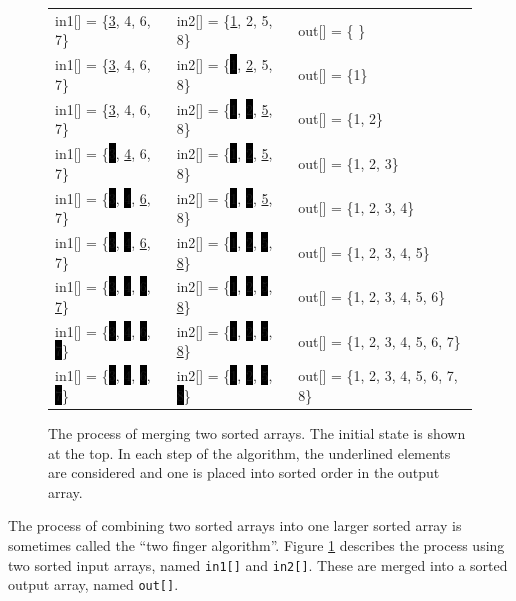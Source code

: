 \begin{figure}
\centering
\setlength{\fboxsep}{0pt}
\begin{tabular} {l l l } 
in1[] = \{\underline{3}, 4, 6, 7\} & in2[] = \{\underline{1}, 2, 5, 8\} & out[] = \{ \} \\
in1[] = \{\underline{3}, 4, 6, 7\} & in2[] = \{\colorbox{black}{1}, \underline{2}, 5, 8\}  & out[] = \{1\} \\
in1[] = \{\underline{3}, 4, 6, 7\} & in2[] = \{\colorbox{black}{1}, \colorbox{black}{2}, \underline{5}, 8\} & out[] = \{1, 2\} \\
in1[] = \{\colorbox{black}{3}, \underline{4}, 6, 7\} & in2[] = \{\colorbox{black}{1}, \colorbox{black}{2}, \underline{5}, 8\} & out[] = \{1, 2, 3\} \\
in1[] = \{\colorbox{black}{3}, \colorbox{black}{4}, \underline{6}, 7\} & in2[] = \{\colorbox{black}{1}, \colorbox{black}{2}, \underline{5}, 8\}  & out[] = \{1, 2, 3, 4\} \\
in1[] = \{\colorbox{black}{3}, \colorbox{black}{4}, \underline{6}, 7\} & in2[] = \{\colorbox{black}{1}, \colorbox{black}{2}, \colorbox{black}{5}, \underline{8}\}  & out[] = \{1, 2, 3, 4, 5\} \\
in1[] = \{\colorbox{black}{3}, \colorbox{black}{4}, \colorbox{black}{6}, \underline{7}\}  & in2[] = \{\colorbox{black}{1}, \colorbox{black}{2}, \colorbox{black}{5}, \underline{8}\}  &out[] = \{1, 2, 3, 4, 5, 6\} \\
in1[] = \{\colorbox{black}{3}, \colorbox{black}{4}, \colorbox{black}{6}, \colorbox{black}{7}\}  & in2[] = \{\colorbox{black}{1}, \colorbox{black}{2}, \colorbox{black}{5}, \underline{8}\}  &out[] = \{1, 2, 3, 4, 5, 6, 7\} \\
in1[] = \{\colorbox{black}{3}, \colorbox{black}{4}, \colorbox{black}{6}, \colorbox{black}{7}\}  & in2[] = \{\colorbox{black}{1}, \colorbox{black}{2}, \colorbox{black}{5}, \colorbox{black}{8}\} &out[] = \{1, 2, 3, 4, 5, 6, 7, 8\} \\
\end{tabular}
\caption{The process of merging two sorted arrays.  The initial state is shown at the top.  In each step of the algorithm, the underlined elements are considered and one is placed into sorted order in the output array.}
\label{fig:merge_behavior}
\end{figure}

The process of combining two sorted arrays into one larger sorted array is sometimes called the ``two finger algorithm''.  Figure \ref{fig:merge_behavior} describes the process using two sorted input arrays, named \lstinline{in1[]} and \lstinline{in2[]}. These are merged into a sorted output array, named \lstinline{out[]}.

